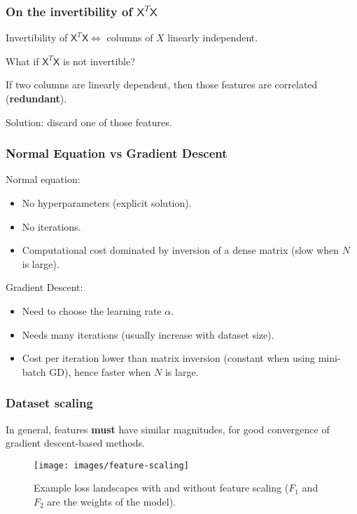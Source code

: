 \documentclass{beamer}
\begin{document}
	\begin{frame}
		\frametitle{On the invertibility of $\mathsf{X}^T\mathsf{X}$}
		
		Invertibility of $\mathsf{X}^T\mathsf{X} \iff$ columns of $X$ linearly independent.
		
		\vspace{5mm}
		
		What if $\mathsf{X}^T\mathsf{X}$ is not invertible?
		
		\vspace{5mm}
		
		If two columns are linearly dependent, then those features are correlated (\textbf{redundant}).
		
		\vspace{5mm}
		
		Solution: discard one of those features.
	\end{frame}

	\begin{frame}
		\frametitle{Normal Equation vs Gradient Descent}
		Normal equation:
		\begin{itemize}
			\item No hyperparameters (explicit solution).
			\item No iterations.
			\item Computational cost dominated by inversion of a dense matrix (slow when $N$ is large).
		\end{itemize}
	
		\vspace{5mm}
	
		Gradient Descent:
		\begin{itemize}
			\item Need to choose the learning rate $\alpha$.
			\item Needs many iterations (usually increase with dataset size).
			\item Cost per iteration lower than matrix inversion (constant when using mini-batch GD), hence faster when $N$ is large.
		\end{itemize}
	\end{frame}


	\begin{frame}
		\frametitle{Dataset scaling}
		In general, features \textbf{must} have similar magnitudes, for good convergence of gradient descent-based methods.
		\vspace{1mm}
		
		\begin{figure}
			\centering
			\texttt{[image: images/feature-scaling]}
			\caption{Example loss landscapes with and without feature scaling ($F_1$ and $F_2$ are the weights of the model).}
		\end{figure}
	\end{frame}
\end{document}
